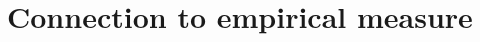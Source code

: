 \documentclass{article}
\begin{document}










\section{Connection to empirical measure}
\end{document}
